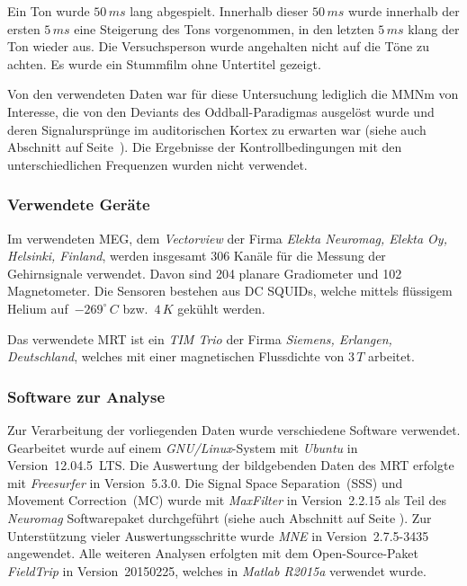 \documentclass[doc,a4paper,12pt]{apa6}
\makeatletter
\DeclareRobustCommand*{\nameref}[1]{%
      \glqq{\myorg@nameref{#1}}\grqq%
    }%
\makeatother
\begin{document}
Ein Ton wurde $50\,ms$ lang abgespielt. Innerhalb dieser $50\,ms$ wurde innerhalb der ersten $5\,ms$ eine Steigerung des Tons vorgenommen, in den letzten $5\,ms$ klang der Ton wieder aus. Die Versuchsperson wurde angehalten nicht auf die Töne zu achten. Es wurde ein Stummfilm ohne Untertitel gezeigt.

Von den verwendeten Daten war für diese Untersuchung lediglich die MMNm von Interesse, die von den Deviants des Oddball-Paradigmas ausgelöst wurde und deren Signalursprünge im auditorischen Kortex zu erwarten war (siehe auch Abschnitt \nameref{sec:audicort} auf Seite~\pageref{sec:audicort}). Die Ergebnisse der Kontrollbedingungen mit den unterschiedlichen Frequenzen wurden nicht verwendet.

\subsubsection{Verwendete Geräte}

Im verwendeten MEG, dem \emph{Vectorview} der Firma \emph{Elekta Neuromag, Elekta Oy, Helsinki, Finland}, werden insgesamt 306 Kanäle für die Messung der Gehirnsignale verwendet. Davon sind 204 planare Gradiometer und 102 Magnetometer. Die Sensoren bestehen aus DC SQUIDs, welche mittels flüssigem Helium auf~$-269^\circ\,C$ bzw.~$4\,K$ gekühlt werden.

Das verwendete MRT ist ein \emph{TIM Trio} der Firma \emph{Siemens, Erlangen, Deutschland}, welches mit einer magnetischen Flussdichte von $3\,T$ arbeitet.

\subsubsection{Software zur Analyse}
\label{sec:software}

Zur Verarbeitung der vorliegenden Daten wurde verschiedene Software verwendet. Gearbeitet wurde auf einem \emph{GNU/Linux}-System mit \emph{Ubuntu} in Version~12.04.5~LTS. Die Auswertung der bildgebenden Daten des MRT erfolgte mit \emph{Free\-surfer} in Version~5.3.0. Die Signal Space Separation~(SSS) und Movement Correction~(MC) wurde mit \emph{MaxFilter} in Version~2.2.15 als Teil des \emph{Neuromag} Softwarepaket durchgeführt (siehe auch Abschnitt \nameref{sec:maxfilter} auf Seite \pageref{sec:maxfilter}). Zur Unterstützung vieler Auswertungsschritte wurde \emph{MNE} in Version~2.7.5-3435 angewendet. Alle weiteren Analysen erfolgten mit dem Open-Source-Paket \emph{FieldTrip} in Version~20150225, welches in \emph{Matlab R2015a} verwendet wurde.
\end{document}
